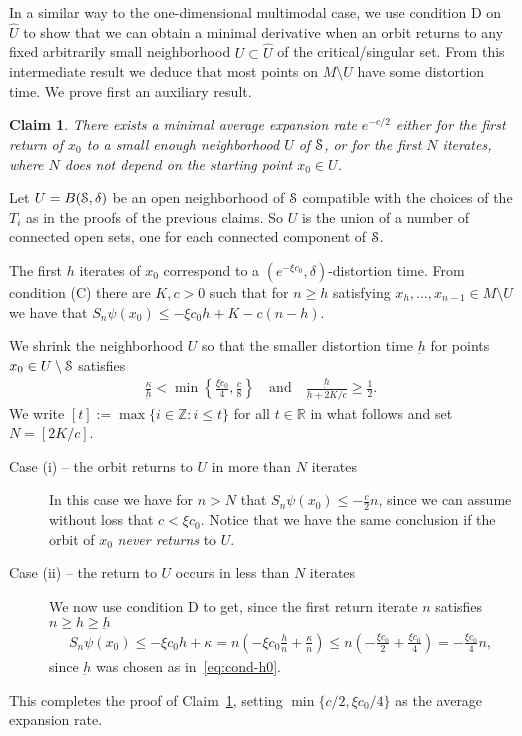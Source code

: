 \documentclass[reqno,12pt,a4paper]{amsart}
\theoremstyle{plain}
\newtheorem{claim}[theorem]{Claim}
\theoremstyle{definition}
\begin{document}
In a similar way to the one-dimensional multimodal case, we
use condition D on $\hat U$ to show that we can obtain a
minimal derivative when an orbit returns to any fixed
arbitrarily small neighborhood $U\subset\hat U$ of the
critical/singular set. From this intermediate result we
deduce that most points on $M\setminus U$ have some
distortion time.  We prove first an auxiliary result.

\begin{claim}
  \label{claim:b1}
  There exists a minimal average expansion rate $e^{- c/2}$
  either for the first return of $x_0$ to a small enough
  neighborhood $U$ of ${\EuScript{S}}$, or for the first $N$
  iterates, where $N$ does not depend on the starting
  point $x_0\in U$.
\end{claim}

Let $U=B({\EuScript{S}},\delta)$ be an open neighborhood of ${\EuScript{S}}$
compatible with the choices of the $T_i$ as in the proofs of
the previous claims. So $U$ is the union of a number of
connected open sets, one for each connected component of
${\EuScript{S}}$.

The first $h$ iterates of $x_0$ correspond to a $(e^{-\xi
  c_0},\delta)$-distortion time.  From condition (C) there
are $K,c>0$ such that for $n\ge h$ satisfying $x_h,\dots,
x_{n-1}\in M\setminus U$ we have that $S_n\psi(x_0)\le -\xi
c_0 h + K - c (n-h)$.
 
We shrink the neighborhood $U$ so that the smaller
distortion time $\underbar h$ for points $x_0\in U\setminus{\EuScript{S}}$
satisfies
\begin{align}\label{eq:cond-h0}
  \frac{\kappa}{\underbar h}
  <
  \min\left\{\frac{\xi c_0}4,\frac{c}8\right\}
  \quad\text{and}\quad
  \frac{\underbar h}{\underbar h+2 K/ c}\ge \frac12.
\end{align}
We write $[t]:=\max\{i\in{{\mathbb Z}}:i\le t\}$ for all $t\in{{\mathbb R}}$ in
what follows and set $N=[2 K/ c]$.
\begin{description}
\item[Case (i) -- the orbit returns to $U$ in more than $N$
  iterates] In this case we have for $n > N$ that $
  S_n\psi(x_0) \le -\frac{ c}2 n$,
  since we can assume without loss that $c < \xi c_0$.
  Notice that we have the same conclusion if the orbit of
  $x_0$ \emph{never returns} to $U$.
\item[Case (ii) -- the return to $U$ occurs in less than
  $N$ iterates] We now use condition D to get, since the
  first return iterate $n$ satisfies $n\ge h\ge \underbar h$
  \begin{align*}
    S_n\psi(x_0)\le -\xi c_0 h +\kappa
    =
    n (-\xi c_0\frac{h}n + \frac\kappa{n})
    \le
    n (-\frac{\xi c_0}2 + \frac{\xi c_0}4)
    = -\frac{\xi  c_0}4 n,
  \end{align*}
  since $\underbar h$ was chosen as in~\eqref{eq:cond-h0}.
\end{description}
This completes the proof of Claim~\ref{claim:b1}, setting
$\min\{ c/2, \xi c_0/4\}$ as the average expansion rate.
\end{document}
